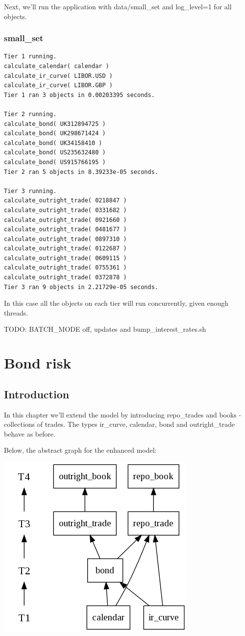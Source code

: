 \documentclass{report}
\begin{document}
Next, we'll run the application with data/small_set and log_level=1 for all objects.

\subsection{small_set}

\begin{verbatim}
Tier 1 running.
calculate_calendar( calendar )
calculate_ir_curve( LIBOR.USD )
calculate_ir_curve( LIBOR.GBP )
Tier 1 ran 3 objects in 0.00203395 seconds.

Tier 2 running.
calculate_bond( UK312894725 )
calculate_bond( UK298671424 )
calculate_bond( UK34158410 )
calculate_bond( US235632480 )
calculate_bond( US915766195 )
Tier 2 ran 5 objects in 8.39233e-05 seconds.

Tier 3 running.
calculate_outright_trade( 0218847 )
calculate_outright_trade( 0331682 )
calculate_outright_trade( 0921660 )
calculate_outright_trade( 0481677 )
calculate_outright_trade( 0897310 )
calculate_outright_trade( 0122687 )
calculate_outright_trade( 0609115 )
calculate_outright_trade( 0755361 )
calculate_outright_trade( 0372878 )
Tier 3 ran 9 objects in 2.21729e-05 seconds.
\end{verbatim}

In this case all the objects on each tier will run concurrently, given enough threads.

TODO: BATCH_MODE off, updates and bump_interest_rates.sh

\chapter{Bond risk}

\section{Introduction}

In this chapter we'll extend the model by introducing repo_trades and books - collections of trades. The types ir_curve, calendar, bond and outright_trade behave as before.

Below, the abstract graph for the enhanced model:

\includegraphics[scale=0.5]{bondriskabstract.png} 
\end{document}

